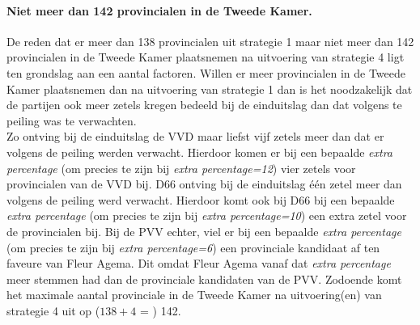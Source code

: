 \paragraph{Niet meer dan 142 provincialen in de Tweede Kamer.}
De reden dat er meer dan 138 provincialen uit strategie 1 maar niet meer dan 142 provincialen in de Tweede Kamer plaatsnemen na uitvoering van strategie 4 ligt ten grondslag aan een aantal factoren. Willen er meer provincialen in de Tweede Kamer plaatsnemen dan na uitvoering van strategie 1 dan is het noodzakelijk dat de partijen ook meer zetels kregen bedeeld bij de einduitslag dan dat volgens te peiling was te verwachten. 
\\
\indent Zo ontving bij de einduitslag de VVD maar liefst vijf zetels meer dan dat er volgens de peiling werden verwacht. Hierdoor komen er bij een bepaalde \textit{extra percentage} (om precies te zijn bij \textit{extra percentage=12}) vier zetels voor provincialen van de VVD bij. D66 ontving bij de einduitslag één zetel meer dan volgens de peiling werd verwacht. Hierdoor komt ook bij D66 bij een bepaalde \textit{extra percentage} (om precies te zijn bij \textit{extra percentage=10}) een extra zetel voor de provincialen bij. Bij de PVV echter, viel er bij een bepaalde \textit{extra percentage} (om precies te zijn bij \textit{extra percentage=6}) een provinciale kandidaat af ten faveure van Fleur Agema. Dit omdat Fleur Agema vanaf dat \textit{extra percentage} meer stemmen had dan de provinciale kandidaten van de PVV. Zodoende komt het maximale aantal provinciale in de Tweede Kamer na uitvoering(en) van strategie 4 uit op ($138+4$ = ) 142.


